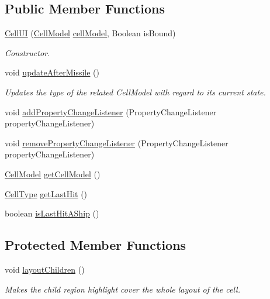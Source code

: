 \subsection*{Public Member Functions}
\begin{DoxyCompactItemize}
\item 
\hyperlink{classbattleship2D_1_1ui_1_1CellUI_ac4554c21f5994228aa9d90c16a13ad01}{Cell\-U\-I} (\hyperlink{classbattleship2D_1_1model_1_1CellModel}{Cell\-Model} \hyperlink{classbattleship2D_1_1ui_1_1CellUI_ae8ba5dba09afebc304ec693a37950cfb}{cell\-Model}, Boolean is\-Bound)
\begin{DoxyCompactList}\small\item\em Constructor. \end{DoxyCompactList}\item 
void \hyperlink{classbattleship2D_1_1ui_1_1CellUI_a4b4ab9aec58484c4dd36e30e063e059a}{update\-After\-Missile} ()
\begin{DoxyCompactList}\small\item\em Updates the type of the related Cell\-Model with regard to its current state. \end{DoxyCompactList}\item 
void \hyperlink{classbattleship2D_1_1ui_1_1CellUI_a9919284fa47292e41aa7856751af2b2a}{add\-Property\-Change\-Listener} (Property\-Change\-Listener property\-Change\-Listener)
\item 
void \hyperlink{classbattleship2D_1_1ui_1_1CellUI_a4bc5f31aad68826675104652b1869827}{remove\-Property\-Change\-Listener} (Property\-Change\-Listener property\-Change\-Listener)
\item 
\hyperlink{classbattleship2D_1_1model_1_1CellModel}{Cell\-Model} \hyperlink{classbattleship2D_1_1ui_1_1CellUI_a2cdaba86d1055ed6dfde80b09deedb4e}{get\-Cell\-Model} ()
\item 
\hyperlink{enumbattleship2D_1_1model_1_1CellType}{Cell\-Type} \hyperlink{classbattleship2D_1_1ui_1_1CellUI_a8eed8495b17ef5246f657637022c65b0}{get\-Last\-Hit} ()
\item 
boolean \hyperlink{classbattleship2D_1_1ui_1_1CellUI_ad465fe1a971a0e9090a5b8ed5eadb918}{is\-Last\-Hit\-A\-Ship} ()
\end{DoxyCompactItemize}
\subsection*{Protected Member Functions}
\begin{DoxyCompactItemize}
\item 
void \hyperlink{classbattleship2D_1_1ui_1_1CellUI_ab7005bcc71788dd2614e02ddab9f52ce}{layout\-Children} ()
\begin{DoxyCompactList}\small\item\em Makes the child region highlight cover the whole layout of the cell. \end{DoxyCompactList}\end{DoxyCompactItemize}
